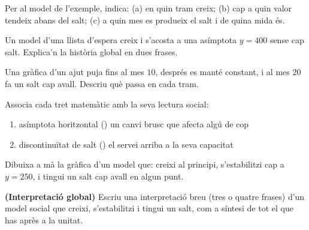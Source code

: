 \begin{exercicis}
\begin{exlist}
  \item Per al model de l'exemple, indica: (a) en quin tram creix; (b) cap a quin valor
        tendeix abans del salt; (c) a quin mes es produeix el salt i de quina mida és.
  \item Un model d'una llista d'espera creix i s'acosta a una asímptota $y=400$ sense
        cap salt. Explica'n la història global en dues frases.
  \item Una gràfica d'un ajut puja fins al mes $10$, després es manté constant, i al mes
        $20$ fa un salt cap avall. Descriu què passa en cada tram.
  \item Associa cada tret matemàtic amb la seva lectura social:
        \begin{enumerate}[label=\alph*), leftmargin=1.6em, topsep=2pt]
          \item asímptota horitzontal \quad (\;) un canvi brusc que afecta algú de cop
          \item discontinuïtat de salt \quad (\;) el servei arriba a la seva capacitat
        \end{enumerate}
  \item Dibuixa a mà la gràfica d'un model que: creixi al principi, s'estabilitzi cap a
        $y=250$, i tingui un salt cap avall en algun punt.
  \item \textbf{(Interpretació global)} Escriu una interpretació breu (tres o quatre
        frases) d'un model social que creixi, s'estabilitzi i tingui un salt, com a
        síntesi de tot el que has après a la unitat.
\end{exlist}
\end{exercicis}

